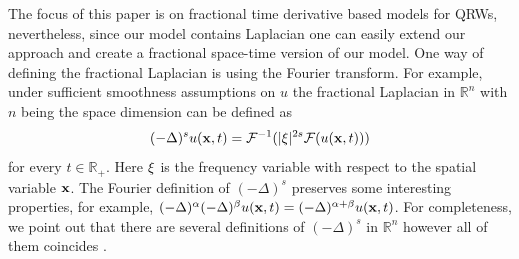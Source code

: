 \documentclass{siamart1116}
\begin{document}
The focus of this paper is on fractional time derivative based models for QRWs, nevertheless, 
since our model contains Laplacian one can easily extend our approach and create a fractional 
space-time version of our model. One way of defining the fractional Laplacian is using the 
Fourier transform. For example, under sufficient smoothness assumptions on $u$ the fractional 
Laplacian in $\mathbb{R}^n$ with $n$ being the space dimension can be defined as 
 $$
    (-\Delta)^su({\bf x},t) = \mathcal{F}^{-1}(|{\bf \xi}|^{2s}\mathcal{F}(u({\bf x},t)))
 $$
for every $t \in \mathbb{R}_{+}$. Here ${\bf \xi}$ is the frequency variable with respect 
to the spatial variable ${\bf x}$. The Fourier definition of $(-\Delta)^s$ preserves some 
interesting properties, for example, $(-\Delta)^\alpha(-\Delta)^\beta u({\bf x},t) = (-\Delta)^{\alpha+\beta}u({\bf x},t)$. For completeness, we point out that there are several
definitions of $(-\Delta)^s$ in $\mathbb{R}^n$ however all of them coincides 
\cite{SMMolcanov_EOstrovski_1969a,Caf3}. 
\end{document}
